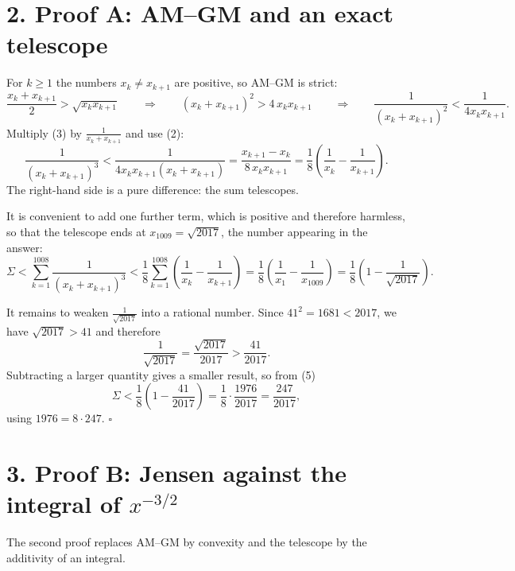 \documentclass[12pt]{article}
\newcommand{\xk}{x_k}
\newcommand{\xkp}{x_{k+1}}
\begin{document}
\section*{2. Proof A: AM--GM and an exact telescope}

For \(k\ge1\) the numbers \(\xk\ne\xkp\) are positive, so AM--GM is
strict:
\[
\frac{\xk+\xkp}{2}>\sqrt{\xk\xkp}
\qquad\Longrightarrow\qquad
(\xk+\xkp)^2>4\,\xk\xkp
\qquad\Longrightarrow\qquad
\frac1{(\xk+\xkp)^2}<\frac1{4\xk\xkp}.
\tag{3}
\]
Multiply (3) by \(\frac1{\xk+\xkp}\) and use (2):
\[
\frac1{(\xk+\xkp)^3}
<\frac1{4\xk\xkp(\xk+\xkp)}
=\frac{\xkp-\xk}{8\,\xk\xkp}
=\frac18\left(\frac1{\xk}-\frac1{\xkp}\right).
\tag{4}
\]
The right-hand side is a pure difference: the sum telescopes.

It is convenient to add one further term, which is positive and therefore
harmless, so that the telescope ends at \(x_{1009}=\sqrt{2017}\), the
number appearing in the answer:
\[
\Sigma<\sum_{k=1}^{1008}\frac1{(\xk+\xkp)^3}
<\frac18\sum_{k=1}^{1008}\left(\frac1{\xk}-\frac1{\xkp}\right)
=\frac18\left(\frac1{x_1}-\frac1{x_{1009}}\right)
=\frac18\left(1-\frac1{\sqrt{2017}}\right).
\tag{5}
\]

It remains to weaken \(\frac1{\sqrt{2017}}\) into a rational number.
Since \(41^2=1681<2017\), we have \(\sqrt{2017}>41\) and therefore
\[
\frac1{\sqrt{2017}}=\frac{\sqrt{2017}}{2017}>\frac{41}{2017}.
\]
Subtracting a larger quantity gives a smaller result, so from (5)
\[
\Sigma<\frac18\left(1-\frac{41}{2017}\right)
=\frac18\cdot\frac{1976}{2017}
=\frac{247}{2017},
\]
using \(1976=8\cdot247\). \(\square\)

\section*{3. Proof B: Jensen against the integral of \(x^{-3/2}\)}

The second proof replaces AM--GM by convexity and the telescope by the
additivity of an integral.
\end{document}
